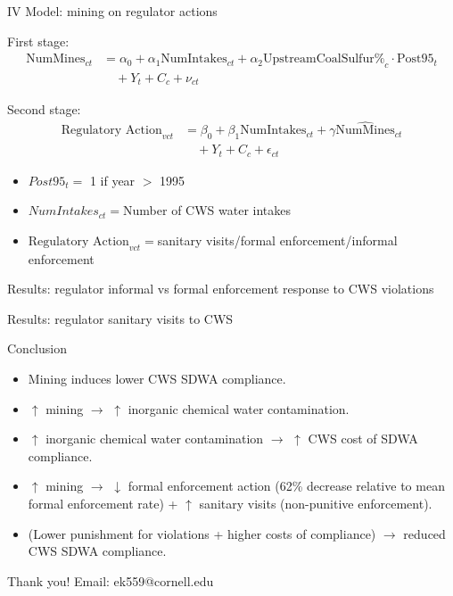 \documentclass{beamer}
\begin{document}
\begin{frame}{IV Model: mining on regulator actions}

First stage:
\begin{equation}\label{1ststage2sls}
\begin{split}
\text{NumMines}_{ct} &= \alpha_0 + \alpha_1\text{NumIntakes}_{ct} + \alpha_2\text{UpstreamCoalSulfur\%}_c \cdot \text{Post95}_t \\
&\quad + Y_t + C_c + \nu_{ct}
\end{split}
\end{equation}

Second stage:
\begin{equation}\label{2ndstage2sls}
\begin{split}
\text{Regulatory Action}_{vct} &= \beta_0 + \beta_1\text{NumIntakes}_{ct} + \gamma\widehat{\text{NumMines}}_{ct} \\
&\quad + Y_t + C_c + \epsilon_{ct}
\end{split}
\end{equation}

\begin{itemize}
    \begin{itemize}
        \item $Post95_t=$ 1 if year $>$ 1995 
        \item $NumIntakes_{ct}=$Number of CWS water intakes
        \item $\text{Regulatory Action}_{vct}=$sanitary visits/formal enforcement/informal enforcement
    \end{itemize}
\end{itemize}
\end{frame}

\begin{frame}{Results: regulator informal vs formal enforcement response to CWS violations}

\end{frame}

\begin{frame}{Results: regulator sanitary visits to CWS}

\end{frame}

\begin{frame}{Conclusion}
\begin{itemize}
    \item Mining induces lower CWS SDWA compliance.
    \item $\uparrow$ mining $\rightarrow$   $\uparrow$ inorganic chemical water contamination.
    \item $\uparrow$ inorganic chemical water contamination $\rightarrow$ $\uparrow$ CWS cost of SDWA compliance.
    \item $\uparrow$ mining $\rightarrow$ $\downarrow$ formal enforcement action (62\% decrease relative to mean formal enforcement rate) + $\uparrow$ sanitary visits (non-punitive enforcement).
    \item (Lower punishment for violations + higher costs of compliance) $\rightarrow$ reduced CWS SDWA compliance.
\end{itemize}
\end{frame}

\begin{frame}{Thank you!}
    Email: ek559@cornell.edu
\end{frame}
\end{document}
